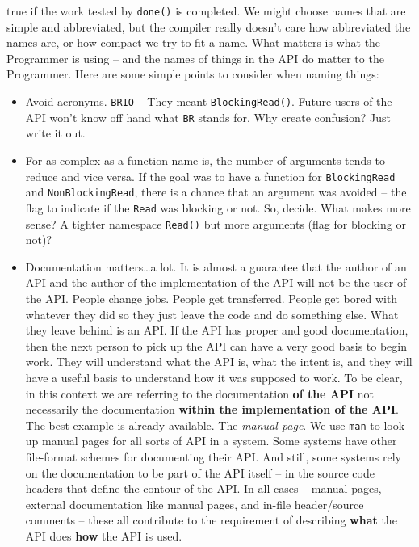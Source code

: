 \documentclass[12pt]{article}
\begin{document}
\begin{enumerate}
\begin{enumerate}
true if the work tested by {\texttt{done()}} is completed.  We might
choose names that are simple and abbreviated, but the compiler really
doesn't care how abbreviated the names are, or how compact we try to
fit a name.  What matters is what the Programmer is using -- and the names
of things in the API do matter to the Programmer.   Here are some simple
points to consider when naming things:
   \begin{itemize}
     \item Avoid acronyms.  {\texttt{BRIO}} -- They meant
{\texttt{BlockingRead()}}.  Future users of the API won't know
off hand what {\texttt{BR}} stands for.  Why create confusion? Just write
it out.
     \item For as complex as a function name is, the number of arguments
tends to reduce and vice versa.  If the goal was to have a function for
{\texttt{BlockingRead}} and {\texttt{NonBlockingRead}}, there is a chance
that an argument was avoided -- the flag to indicate if the {\texttt{Read}}
was blocking or not.  So, decide.  What makes more sense?  A tighter
namespace {\texttt{Read()}} but more arguments (flag for blocking or not)?
    \item  Documentation matters\ldots a lot.   It is almost a guarantee
that the author of an API and the author of the implementation of the API
will not be the user of the API.  People change jobs.  People get
transferred. People get bored with whatever they did so they just leave
the code and do something else.  What they leave behind is an API.  If the
API has proper and good documentation, then the next person to pick up the API
can have a very good basis to begin work.  They will understand
what the API is, what the intent is, and they will have a useful basis
to understand how it was supposed to work.  To be clear, in this context
we are referring to the documentation {\textbf{of the API}} not necessarily
the documentation {\textbf{within the implementation of the API}}.  The
best example is already available.  The {\textit{manual page}}.  We use
{\texttt{man}} to look up manual pages for all sorts of API in a system.
Some systems have other file-format schemes for documenting their API.
And still, some systems rely on the documentation to be part of the
API itself -- in the source code headers that define the contour of the API.
In all cases -- manual pages, external documentation like manual pages,
and in-file header/source comments -- these all contribute to the requirement
of describing {\textbf{what}} the API does {\textbf{how}} the API is used.
\par

\end{itemize}
\end{enumerate}
\end{enumerate}
\end{document}
